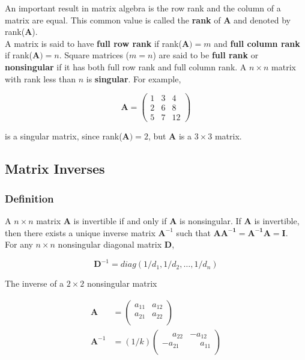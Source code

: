 \documentclass[11pt]{article}
\theoremstyle{definition}
\begin{document}
An important result in matrix algebra is the row rank and the column of a matrix are equal.  This common value is called the \textbf{rank} of $\mathbf{A}$ and denoted by rank($\mathbf{A}$).\\

A matrix is said to have \textbf{full row rank} if rank($\mathbf{A}) = m$ and \textbf{full column rank} if rank($\mathbf{A}) = n$.  Square matrices ($m = n$) are said to be \textbf{full rank} or \textbf{nonsingular} if it has both full row rank and full column rank.  A $n \times n$ matrix with rank less than $n$ is \textbf{singular}.  For example,

\[\mathbf{A} = \begin{pmatrix}
    1 & 3 & 4\\
    2 & 6 & 8 \\
    5 & 7 & 12   
\end{pmatrix}
\]

is a singular matrix, since rank($\mathbf{A}) = 2$, but $\mathbf{A}$ is a $ 3 \times 3$ matrix.

\subsection{Matrix Inverses}
\subsubsection{Definition}
A $n \times n$ matrix $\mathbf{A}$ is invertible if and only if $\mathbf{A}$ is nonsingular.  If $\mathbf{A}$ is invertible, then there exists a unique inverse matrix $\mathbf{A}^{-1}$ such that $\mathbf{AA^{-1}} = \mathbf{A^{-1}A} = \mathbf{I}$.  \\

For any $n \times n$ nonsingular diagonal matrix $\mathbf{D}$,

\[ \mathbf{D}^{-1} = diag(1/d_1, 1/d_2, \hdots, 1/d_n)\]

The inverse of a $2 \times 2$ nonsingular matrix

\begin{align*}
\mathbf{A} &= \begin{pmatrix}
    a_{11} & a_{12} \\
    a_{21} & a_{22}  \\  
\end{pmatrix}\\
    \mathbf{A}^{-1} &= (1/k)\begin{pmatrix}
    \phantom{-}a_{22} & -a_{12} \\
    -a_{21} & \phantom{-}a_{11}  \\  
\end{pmatrix}\\
\end{align*}
\end{document}
